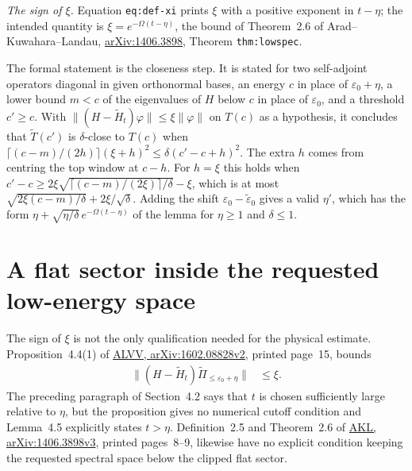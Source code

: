 \documentclass{article}
\begin{document}
\emph{The sign of $\xi$.} Equation \texttt{eq:def-xi} prints $\xi$ with a
positive exponent in $t-\eta$; the intended quantity is
$\xi=e^{-\Omega(t-\eta)}$, the bound of Theorem~2.6 of Arad--Kuwahara--Landau,
\href{https://arxiv.org/abs/1406.3898}{arXiv:1406.3898}, Theorem
\texttt{thm:lowspec}.

The formal statement 
is the closeness step. It is stated for two self-adjoint operators diagonal
in given orthonormal bases, an energy $c$ in place of $\varepsilon_0+\eta$, a
lower bound $m<c$ of the eigenvalues of $H$ below $c$ in place of
$\varepsilon_0$, and a threshold $c'\ge c$. With
$\|(H-\tilde H_t)\varphi\|\le\xi\|\varphi\|$ on $T(c)$ as a hypothesis, it
concludes that $\tilde T(c')$ is $\delta$-close to $T(c)$ when
$\lceil(c-m)/(2h)\rceil(\xi+h)^2\le\delta(c'-c+h)^2$. The extra $h$ comes from
centring the top window at $c-h$. For $h=\xi$ this holds when
$c'-c\ge2\xi\sqrt{\lceil(c-m)/(2\xi)\rceil/\delta}-\xi$, which is at most
$\sqrt{2\xi(c-m)/\delta}+2\xi/\sqrt\delta$. Adding the shift
$\varepsilon_0-\tilde\varepsilon_0$ gives a valid $\eta'$, which has the form
$\eta+\sqrt{\eta/\delta}\,e^{-\Omega(t-\eta)}$ of the lemma for $\eta\ge1$ and
$\delta\le1$.

\section{A flat sector inside the requested low-energy space}

The sign of $\xi$ is not the only qualification needed for the physical
estimate. Proposition~4.4(1) of
\href{https://arxiv.org/pdf/1602.08828v2}{ALVV, arXiv:1602.08828v2},
printed page~15, bounds
\begin{align*}
    \|(H-\widetilde H_t)\widetilde\Pi_{\le\varepsilon_0+\eta}\|
     & \le\xi.
\end{align*}
The preceding paragraph of Section~4.2 says that $t$ is chosen sufficiently
large relative to $\eta$, but the proposition gives no numerical cutoff
condition and Lemma~4.5 explicitly states $t>\eta$.
Definition~2.5 and Theorem~2.6 of
\href{https://arxiv.org/pdf/1406.3898}{AKL, arXiv:1406.3898v3},
printed pages~8--9, likewise have no explicit condition keeping the
requested spectral space below the clipped flat sector.
\end{document}
